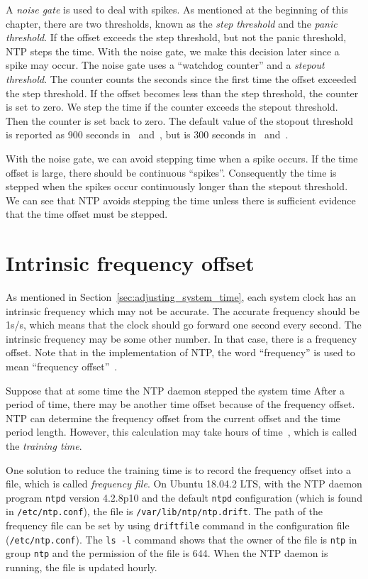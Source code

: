 A \emph{noise gate} is used to deal with spikes. As mentioned at the beginning 
of this chapter, there are two thresholds, known as the \emph{step threshold}
and the
\emph{panic threshold}. If the offset exceeds the step threshold, but not the
panic threshold, NTP steps the time. With the noise gate, we make this decision
later since a spike may occur. The noise gate uses a ``watchdog counter'' and a
\emph{stepout threshold}. The counter counts the seconds since the first time
the offset exceeded the step threshold. If the offset becomes less than the step
threshold, the counter is set to zero. We step the time if the counter exceeds
the stepout threshold. Then the counter is set back to zero. The default value
of the stopout threshold is reported as 900 seconds in~\cite{redbook}
and~\cite{rfc5905}, but is 300 seconds in~\cite{source_code}
and~\cite{clock_state_machine}. 

With the noise gate, we can avoid stepping time when a spike occurs. If the
time offset is large, there should be continuous ``spikes''. Consequently the
time is stepped when the spikes
occur continuously longer than the stepout threshold. We can see
that NTP avoids stepping the time unless there is sufficient evidence that the
time offset must be stepped. 

\section{Intrinsic frequency offset}%
\label{sec:intrinsic_frequency_offset}
As mentioned in Section~\ref{sec:adjusting_system_time}, each system clock has an
intrinsic frequency which may not be accurate. The accurate frequency should be
1s/s, which means that the clock should go forward one second every second. The
intrinsic frequency may be some other number. In that case, there is a
frequency offset. Note that in the implementation of NTP\null, the word
``frequency'' is used to mean ``frequency offset''~\cite{source_code}. 

Suppose that at some time the NTP daemon stepped the system time After a period
of time, there may be another time offset because of the frequency offset. NTP
can determine the frequency offset from the current offset and the time period
length.  However, this calculation may take hours of time~\cite{redbook}, which
is called the \emph{training time}. 

One solution to reduce the training time is to record the frequency offset into a file,
which is called \emph{frequency file}. On Ubuntu 18.04.2 LTS, with the NTP
daemon program \verb|ntpd| version 4.2.8p10 and the default \verb|ntpd|
configuration (which is found in \verb|/etc/ntp.conf|), the file is
\verb|/var/lib/ntp/ntp.drift|. The path of the frequency file can be set by
using \verb|driftfile| command in the configuration file
(\verb|/etc/ntp.conf|). The \verb|ls -l| command shows that the owner of
the file is \verb|ntp| in group \verb|ntp| and the permission of the file is
644. When the NTP daemon is running, the file is updated hourly.

